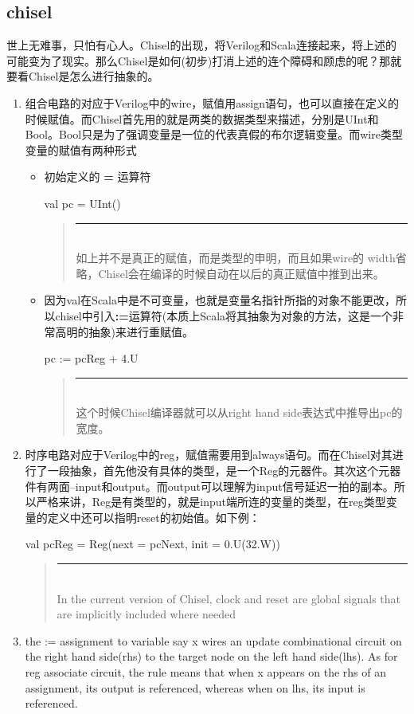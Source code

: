 \documentclass[twocolumn,10pt]{article}
\newenvironment{commentary}
{ \vspace{-0.1in}
  \begin{quotation}
  \noindent
  \small \em
  \rule{\linewidth}{1pt}\\
}
{
  \end{quotation}
}
\begin{document}
\subsection{chisel}
世上无难事，只怕有心人。Chisel的出现，将Verilog和Scala连接起来，将上述的可能变为了现实。那么Chisel是如何(初步)打消上述的连个障碍和顾虑的呢？那就要看Chisel是怎么进行抽象的。
\begin{enumerate}
	\item 组合电路的对应于Verilog中的wire，赋值用assign语句，也可以直接在定义的时候赋值。而Chisel首先用的就是两类的数据类型来描述，分别是UInt和Bool。Bool只是为了强调变量是一位的代表真假的布尔逻辑变量。而wire类型变量的赋值有两种形式
	\begin{itemize}
		\item 初始定义的 \textbf{=} 运算符 \begin{scala}
			val pc = UInt()
			\end{scala}
		\begin{commentary}
			如上并不是真正的赋值，而是类型的申明，而且如果wire的 width省略，Chisel会在编译的时候自动在以后的真正赋值中推到出来。
		\end{commentary}
		\item 因为val在Scala中是不可变量，也就是变量名指针所指的对象不能更改，所以chisel中引入\textbf{:=}运算符(本质上Scala将其抽象为对象的方法，这是一个非常高明的抽象)来进行重赋值。\begin{scala}
			pc := pcReg + 4.U
			\end{scala}
		\begin{commentary}
			这个时候Chisel编译器就可以从right hand side表达式中推导出pc的宽度。
		\end{commentary}
	\end{itemize}
	\item 时序电路对应于Verilog中的reg，赋值需要用到always语句。而在Chisel对其进行了一段抽象，首先他没有具体的类型，是一个Reg的元器件。其次这个元器件有两面--input和output。而output可以理解为input信号延迟一拍的副本。所以严格来讲，Reg是有类型的，就是input端所连的变量的类型，在reg类型变量的定义中还可以指明reset的初始值。如下例：\begin{scala}
		val pcReg = Reg(next = pcNext, init = 0.U(32.W))
	\end{scala}
	\begin{commentary}
		In the current version of Chisel, clock and reset are global signals that are implicitly included where needed %
	\end{commentary}
	\item the := assignment to variable say x wires an update combinational circuit on the right hand side(rhs) to the target node on the left hand side(lhs). As for reg associate circuit, the rule means that when x appears on the rhs of an assignment, its output is referenced, whereas when on lhs, its input is referenced. %

\end{enumerate}
\end{document}
